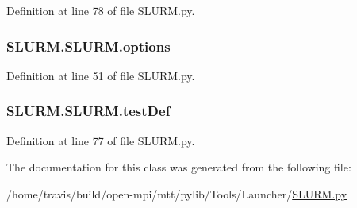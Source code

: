 Definition at line 78 of file S\-L\-U\-R\-M.\-py.

\hypertarget{class_s_l_u_r_m_1_1_s_l_u_r_m_a652a43986b8bda5c6ddb866ab0513ac8}{
\subsubsection[{options}]{\setlength{\rightskip}{0pt plus 5cm}S\-L\-U\-R\-M.\-S\-L\-U\-R\-M.\-options}}\label{class_s_l_u_r_m_1_1_s_l_u_r_m_a652a43986b8bda5c6ddb866ab0513ac8}


Definition at line 51 of file S\-L\-U\-R\-M.\-py.

\hypertarget{class_s_l_u_r_m_1_1_s_l_u_r_m_a9b08ef79e039a8524f1fa6712b45182b}{
\subsubsection[{test\-Def}]{\setlength{\rightskip}{0pt plus 5cm}S\-L\-U\-R\-M.\-S\-L\-U\-R\-M.\-test\-Def}}\label{class_s_l_u_r_m_1_1_s_l_u_r_m_a9b08ef79e039a8524f1fa6712b45182b}


Definition at line 77 of file S\-L\-U\-R\-M.\-py.



The documentation for this class was generated from the following file\-:\begin{DoxyCompactItemize}
\item 
/home/travis/build/open-\/mpi/mtt/pylib/\-Tools/\-Launcher/\hyperlink{_s_l_u_r_m_8py}{S\-L\-U\-R\-M.\-py}\end{DoxyCompactItemize}

